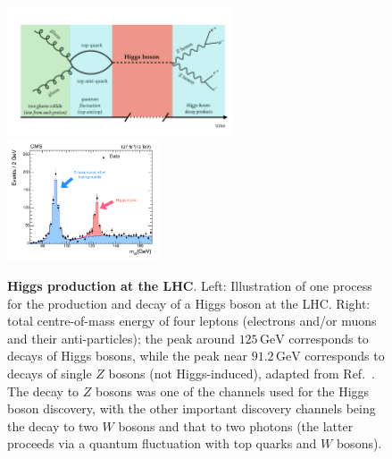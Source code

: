 \documentclass{article}
\begin{document}
\begin{figure}
  \centering
  \includegraphics[width=0.6\textwidth]{figs/Fig3a.pdf}%
    \includegraphics[width=0.4\textwidth]{figs/Fig3-CMS.pdf}
  \caption{{\bf Higgs production at the LHC}. Left:
    Illustration of one process for the production and decay of a Higgs
    boson at the LHC.
    Right: total centre-of-mass energy of four leptons (electrons
    and/or muons and their anti-particles); the peak around
    $125\,\text{GeV}$ corresponds to decays of Higgs bosons, while the
    peak near $91.2\,\text{GeV}$ corresponds to decays of single $Z$
    bosons (not Higgs-induced), adapted from Ref.~\cite{CMS:2021ugl}.
    The decay to $Z$ bosons was one of the channels used
    for the Higgs boson discovery, with the other important
    discovery channels being the decay to two $W$ bosons and that to two
    photons (the latter proceeds via a quantum fluctuation with top
    quarks and $W$ bosons). 
  }
  \label{fig:higgs-prod-decay}
\end{figure}
\end{document}
